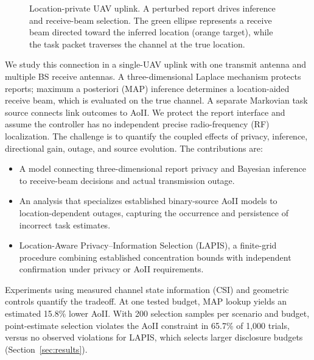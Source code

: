 \documentclass[conference]{IEEEtran}
\begin{document}
\begin{figure}[t]
\centering
\resizebox{\textwidth}{!}{}
\caption{Location-private UAV uplink. A perturbed report drives inference and receive-beam selection. The green ellipse represents a receive beam directed toward the inferred location (orange target), while the task packet traverses the channel at the true location.}
\label{fig:system}
\end{figure}
We study this connection in a single-UAV uplink with one transmit antenna and multiple BS receive antennas. A three-dimensional Laplace mechanism protects reports; maximum a posteriori (MAP) inference determines a location-aided receive beam, which is evaluated on the true channel. A separate Markovian task source connects link outcomes to AoII. We protect the report interface and assume the controller has no independent precise radio-frequency (RF) localization. The challenge is to quantify the coupled effects of privacy, inference, directional gain, outage, and source evolution. The contributions are:
\begin{itemize}
\item A model connecting three-dimensional report privacy and Bayesian inference to receive-beam decisions and actual transmission outage.
\item An analysis that specializes established binary-source AoII models to location-dependent outages, capturing the occurrence and persistence of incorrect task estimates.
\item Location-Aware Privacy--Information Selection (LAPIS), a finite-grid procedure combining established concentration bounds with independent confirmation under privacy or AoII requirements.
\end{itemize}
Experiments using measured channel state information (CSI) and geometric controls quantify the tradeoff. At one tested budget, MAP lookup yields an estimated 15.8\% lower AoII. With 200 selection samples per scenario and budget, point-estimate selection violates the AoII constraint in 65.7\% of 1,000 trials, versus no observed violations for LAPIS, which selects larger disclosure budgets (Section~\ref{sec:results}).








\end{document}
